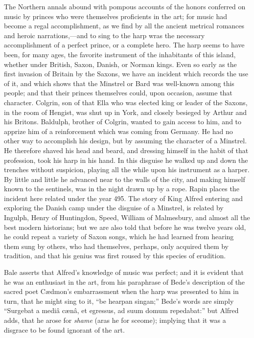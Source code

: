 The Northern annals abound with pompous accounts of the honors conferred
on music by princes who were themselves proficients in the art; for music had
become a regal accomplishment, as we find by all the ancient metrical romances 
and heroic narrations,—and to sing to the
\pagebreak
harp wras the necessary accomplishment
of a perfect prince, or a complete hero. The harp seems to have been, for many 
ages, the favorite instrument of the inhabitants of this island, whether under
British, Saxon, Danish, or Norman kings. Even so early as the first invasion of
Britain by the Saxons, we have an incident which records the use of it, and which
shows that the Minstrel or Bard was well-known among this people; and that their
princes themselves could, upon occasion, assume that character. Colgrin, son of that
Ella who was elected king or leader of the Saxons, in the room of Hengist, was
shut up in York, and closely besieged by Arthur and his Britons. Baldulph,
brother of Colgrin, wanted to gain access to him, and to apprize him of a reinforcement
which was coming from Germany. He had no other way to accomplish
his design, but by assuming the character of a Minstrel. He therefore
shaved his head and beard, and dressing himself in the habit of that profession,
took his harp in his hand. In this disguise he walked up and down the trenches
without suspicion, playing all the while upon his instrument as a harper. By
little and little he advanced near to the walls of the city, and making himself
known to the sentinels, was in the night drawn up by a rope. Rapin places the
incident here related under the year 495. The story of King Alfred entering
and exploring the Danish camp under the disguise of a Minstrel, is related by
Ingulph, Henry of Huntingdon, Speed, William of Malmesbury, and almost all
the best modern historians; but we are also told that before he was twelve years
old, he could repeat a variety of Saxon songs, which he had learned from hearing
them sung by others, who had themselves, perhaps, only acquired them by tradition,
and that his genius was first roused by this species of erudition.

Bale asserts that Alfred’s knowledge of music was perfect; and it is evident
that he was an enthusiast in the art, from his paraphrase of Bede’s description of
the sacred poet Cædmon’s embarrassment when the harp was presented to him in
turn, that he might sing to it, “be hearpan singan;” Bede’s words are simply
“Surgebat a mediâ cænâ, et egressus, ad suum domum repedabat:” but Alfred
adds, that he arose for \textit{shame} (aras he for sceome); implying that it was a disgrace
to be found ignorant of the art.

